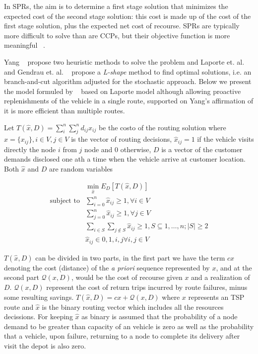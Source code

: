 In SPRs, the aim is to determine a first stage solution that minimizes the expected cost of the second stage solution: this cost is made up of the cost of the first stage solution, plus the expected net cost of recourse. SPRs are typically more difficult to solve than are CCPs, but their objective function is more meaningful ~\cite{gendreau_stochastic_1996}.


Yang ~\cite{yang_stochastic_2000} propose two heuristic methods to solve the problem and Laporte et. al. ~\cite{laporte_integer_2002} and Gendrau et. al. ~\cite{gendreau_exact_1995} propose a \textit{L-shape} method to find optimal solutions, i.e. an branch-and-cut algorithm adjusted for the stochastic approach. Below we present the model formuled by ~\cite{Dror_2005} based on Laporte model although allowing proactive replenishments of the vehicle in a single route, supported on Yang's affirmation of it is more efficient than multiple routes.

Let $T(\hat{x},D) =\sum_i^n\sum_j^nd_{ij}x_{ij}$ be the costo of the routing solution where $\hat{x}=\{x_{ij}\},i\in V,j\in V$ is the vector of routing decisions, $\hat{x}_{ij} =1$ if the vehicle visits directly the node $i$ from $j$ node and $0$ otherwise, $D$ is a vector of the customer demands disclosed one ath a time when the vehicle arrive at customer location. Both $\hat{x}$ and $D$ are random variables

\begin{align}\label{eq:SPR}
  & \min\limits_{\hat{x}} E_D[T(\hat{x},D)]\\ 
 \text{subject to} & \sum_{i=0}^n\hat{x}_{ij} \geq 1, \forall i \in V\\
  & \sum_{j=0}^n\hat{x}_{ij} \geq 1, \forall j \in V\\
  & \sum_{i\in S}\sum_{j\notin S}\hat{x}_{ij} \geq 1, S\subseteq {1,\ldots,n};|S|\geq2\\
  & \hat{x}_{ij} \in {0,1}, i,j \forall i,j \in V
\end{align}

$T(\hat{x},D)$ can be divided in two parts, in the first part we have the term $cx$ denoting the cost (distance) of the \textit{a priori} sequence represented by $x$, and at the second part $\mathcal{Q}(x,D)$, would be the cost of recourse given $x$ and a realization of $D$. $\mathcal{Q}(x,D)$ represent the cost of return trips incurred by route failures, minus some resulting savings.
$T(\hat{x},D) = cx+\mathcal{Q}(x,D)$ where $x$ represents an TSP route and $\hat{x}$ is the binary routing vector which includes all the resources decissions. For keeping $\hat{x}$ as binary is assumed that the probability of a node demand to be greater than capacity of an vehicle is zero as well as the probability that a vehicle, upon failure, returning to a node to complete its delivery after visit the depot is also zero.


